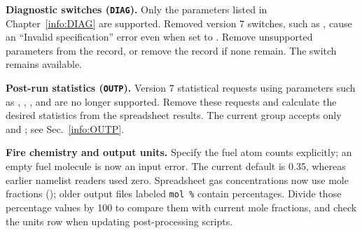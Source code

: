 \noindent\textbf{Diagnostic switches (\texttt{DIAG}).} Only the parameters listed in Chapter~\ref{info:DIAG} are supported. Removed version 7 switches, such as , cause an ``Invalid specification'' error even when set to . Remove unsupported parameters from the record, or remove the record if none remain. The  switch remains available.

\noindent\textbf{Post-run statistics (\texttt{OUTP}).} Version 7 statistical requests using parameters such as , , , and  are no longer supported. Remove these requests and calculate the desired statistics from the spreadsheet results. The current  group accepts only  and ; see Sec.~\ref{info:OUTP}.

\noindent\textbf{Fire chemistry and output units.} Specify the fuel atom counts explicitly; an empty fuel molecule is now an input error. The current default  is 0.35, whereas earlier namelist readers used zero. Spreadsheet gas concentrations now use mole fractions (); older output files labeled \texttt{mol \%} contain percentages. Divide those percentage values by 100 to compare them with current mole fractions, and check the units row when updating post-processing scripts.
